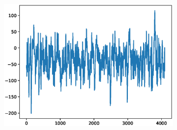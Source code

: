 \documentclass[12pt]{article}
\begin{document}
\begin{figure}
\begin{subfigure}{.25\textwidth}
\end{subfigure}%
\begin{subfigure}{.25\textwidth}
  \centering
  \includegraphics[width=.8\linewidth]{figures/signals/C/N035.eps}
\end{subfigure}


\end{figure}
\end{document}
